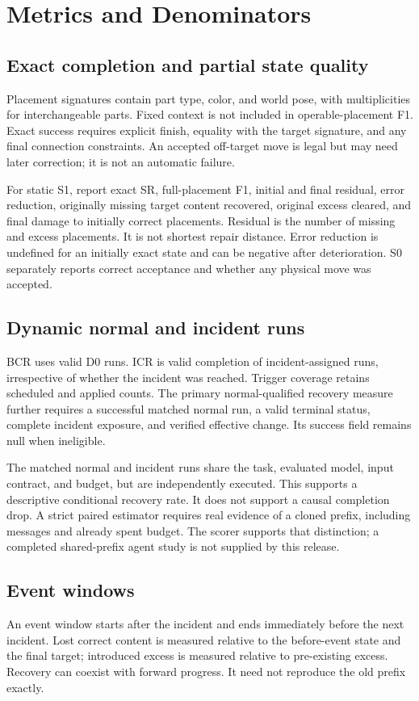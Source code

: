 \documentclass[10pt,twocolumn,letterpaper]{article}
\begin{document}
\section{Metrics and Denominators}
\subsection{Exact completion and partial state quality}
Placement signatures contain part type, color, and world pose, with multiplicities for interchangeable parts. Fixed context is not included in operable-placement F1. Exact success requires explicit finish, equality with the target signature, and any final connection constraints. An accepted off-target move is legal but may need later correction; it is not an automatic failure.

For static S1, report exact SR, full-placement F1, initial and final residual, error reduction, originally missing target content recovered, original excess cleared, and final damage to initially correct placements. Residual is the number of missing and excess placements. It is not shortest repair distance. Error reduction is undefined for an initially exact state and can be negative after deterioration. S0 separately reports correct acceptance and whether any physical move was accepted.

\subsection{Dynamic normal and incident runs}
BCR uses valid D0 runs. ICR is valid completion of incident-assigned runs, irrespective of whether the incident was reached. Trigger coverage retains scheduled and applied counts. The primary normal-qualified recovery measure further requires a successful matched normal run, a valid terminal status, complete incident exposure, and verified effective change. Its success field remains null when ineligible.

The matched normal and incident runs share the task, evaluated model, input contract, and budget, but are independently executed. This supports a descriptive conditional recovery rate. It does not support a causal completion drop. A strict paired estimator requires real evidence of a cloned prefix, including messages and already spent budget. The scorer supports that distinction; a completed shared-prefix agent study is not supplied by this release.

\subsection{Event windows}
An event window starts after the incident and ends immediately before the next incident. Lost correct content is measured relative to the before-event state and the final target; introduced excess is measured relative to pre-existing excess. Recovery can coexist with forward progress. It need not reproduce the old prefix exactly.
\end{document}
